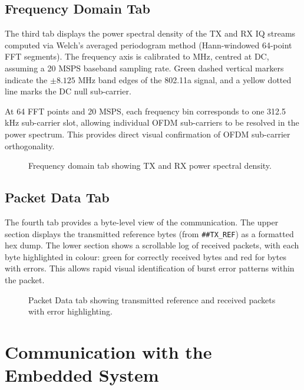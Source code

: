 \documentclass[12pt, a4paper, oneside]{report}
\begin{document}
\subsection{Frequency Domain Tab}

The third tab displays the power spectral density of the TX and RX IQ streams computed via Welch's averaged periodogram method (Hann-windowed 64-point FFT segments). The frequency axis is calibrated to MHz, centred at DC, assuming a 20 MSPS baseband sampling rate. Green dashed vertical markers indicate the $\pm 8.125$ MHz band edges of the 802.11a signal, and a yellow dotted line marks the DC null sub-carrier.

At 64 FFT points and 20 MSPS, each frequency bin corresponds to one 312.5 kHz sub-carrier slot, allowing individual OFDM sub-carriers to be resolved in the power spectrum. This provides direct visual confirmation of OFDM sub-carrier orthogonality.

\begin{figure}[H]
  \centering
  \caption{Frequency domain tab showing TX and RX power spectral density.}
  \label{fig:fft_tab}
\end{figure}

\subsection{Packet Data Tab}

The fourth tab provides a byte-level view of the communication. The upper section displays the transmitted reference bytes (from \texttt{\#\#TX\_REF}) as a formatted hex dump. The lower section shows a scrollable log of received packets, with each byte highlighted in colour: green for correctly received bytes and red for bytes with errors. This allows rapid visual identification of burst error patterns within the packet.

\begin{figure}[H]
  \centering
  \caption{Packet Data tab showing transmitted reference and received packets with error highlighting.}
  \label{fig:pkt_tab}
\end{figure}

\section{Communication with the Embedded System}
\end{document}
